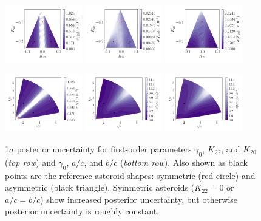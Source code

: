 \documentclass[fleqn,usenatbib]{mnras}
\begin{document}
\begin{figure}
  \includegraphics[width=0.3\textwidth]{figs/probe-space-theta-1-sigma.pdf}\hfill
  \includegraphics[width=0.3\textwidth]{figs/probe-space-theta-2-sigma.pdf}\hfill
  \includegraphics[width=0.3\textwidth]{figs/probe-space-theta-3-sigma.pdf}

  \includegraphics[width=0.3\textwidth]{figs/probe-space-ab-1-sigma.pdf}\hfill
  \includegraphics[width=0.3\textwidth]{figs/probe-space-ab-a-sigma.pdf}\hfill
  \includegraphics[width=0.3\textwidth]{figs/probe-space-ab-b-sigma.pdf}

  \caption{1$\sigma$ posterior uncertainty for first-order parameters $\gamma_0$, $K_{22}$, and $K_{20}$ (\textit{top row}) and $\gamma_0$, $a/c$, and $b/c$ (\textit{bottom row}). Also shown as black points are the reference asteroid shapes: symmetric (red circle) and asymmetric (black triangle). Symmetric asteroids ($K_{22}=0$ or $a/c=b/c$) show increased posterior uncertainty, but otherwise posterior uncertainty is roughly constant.}
  \label{fig:scan-space-sigma}
\end{figure}
\end{document}

